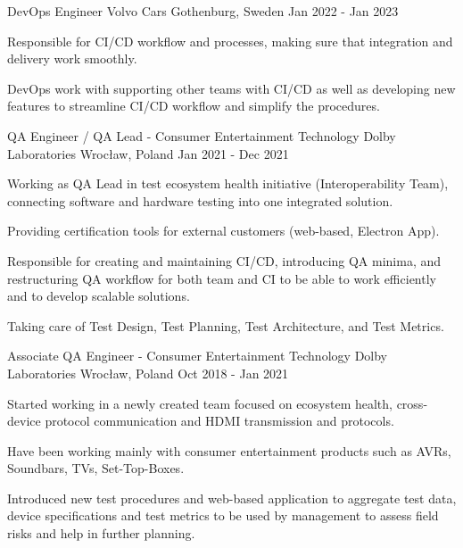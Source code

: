 \begin{cventries}
  \cventry
  {DevOps Engineer} %
  {Volvo Cars} %
  {Gothenburg, Sweden} %
  {Jan 2022 - Jan 2023} %
  {
    \begin{cvitems} %
      \item {Responsible for CI/CD workflow and processes, making sure that integration and delivery work smoothly.}
      \item {DevOps work with supporting other teams with CI/CD as well as developing new features to streamline CI/CD workflow and simplify the procedures.}
    \end{cvitems}
  }

  \cventry
  {QA Engineer / QA Lead - Consumer Entertainment Technology} %
  {Dolby Laboratories} %
  {Wrocław, Poland} %
  {Jan 2021 - Dec 2021} %
  {
    \begin{cvitems} %
      \item {Working as QA Lead in test ecosystem health initiative (Interoperability Team), connecting software and hardware testing into one integrated solution.}
      \item {Providing certification tools for external customers (web-based, Electron App).}
      \item {Responsible for creating and maintaining CI/CD, introducing QA minima, and restructuring QA workflow for both team and CI to be able to work efficiently and to develop scalable solutions.}
      \item {Taking care of Test Design, Test Planning, Test Architecture, and Test Metrics.}
    \end{cvitems}
  }

  \cventry
  {Associate QA Engineer - Consumer Entertainment Technology} %
  {Dolby Laboratories} %
  {Wrocław, Poland} %
  {Oct 2018 - Jan 2021} %
  {
    \begin{cvitems} %
      \item {Started working in a newly created team focused on ecosystem health, cross-device protocol communication and HDMI transmission and protocols.}
      \item {Have been working mainly with consumer entertainment products such as AVRs, Soundbars, TVs, Set-Top-Boxes.}
      \item {Introduced new test procedures and web-based application to aggregate test data, device specifications and test metrics to be used by management to assess field risks and help in further planning.}
    \end{cvitems}
  }


\end{cventries}
